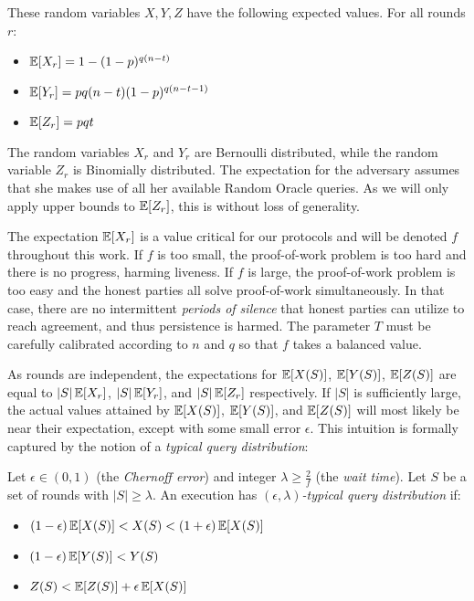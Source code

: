 These random variables $X, Y, Z$ have the following expected values. For all
rounds $r$:

\begin{itemize}
  \item $\operatorname{\mathbb{E}}[X_r] = 1 - (1 - p)^{q(n - t)}$
  \item $\operatorname{\mathbb{E}}[Y_r] = pq(n - t)(1 - p)^{q(n - t - 1)}$
  \item $\operatorname{\mathbb{E}}[Z_r] = pqt$
\end{itemize}

The random variables $X_r$ and $Y_r$ are Bernoulli distributed, while the
random variable $Z_r$ is Binomially distributed.
The expectation for the adversary assumes that she makes use of all
her available Random Oracle queries. As we will only apply upper bounds to
$\operatorname{\mathbb{E}}[Z_r]$, this is without loss of generality.

The expectation $\operatorname{\mathbb{E}}[X_r]$ is a value critical for our protocols and will be
denoted $f$ throughout this work. If $f$ is too small, the
proof-of-work problem is too hard and there is no progress, harming liveness.
If $f$ is large, the proof-of-work problem is too easy and the honest parties
all solve proof-of-work simultaneously. In that case, there are no intermittent
\emph{periods of silence} that honest parties can
utilize to reach agreement, and thus persistence is harmed. The parameter $T$
must be carefully calibrated according to $n$ and $q$ so that $f$ takes a
balanced value.

As rounds are independent, the expectations for $\operatorname{\mathbb{E}}[X(S)]$, $\operatorname{\mathbb{E}}[Y(S)]$,
$\operatorname{\mathbb{E}}[Z(S)]$ are equal to $|S|\operatorname{\mathbb{E}}[X_r]$, $|S|\operatorname{\mathbb{E}}[Y_r]$, and $|S|\operatorname{\mathbb{E}}[Z_r]$
respectively. If $|S|$ is sufficiently large, the actual values attained by
$\operatorname{\mathbb{E}}[X(S)]$, $\operatorname{\mathbb{E}}[Y(S)]$, and $\operatorname{\mathbb{E}}[Z(S)]$ will most likely be near their
expectation, except with some small error $\epsilon$. This intuition is formally
captured by the notion of a \emph{typical query distribution}:

\begin{definition}
  \index{$\epsilon$}\index{$\lambda$}
  Let $\epsilon \in (0, 1)$ (the \emph{Chernoff error}) and integer $\lambda
  \geq \frac{2}{f}$ (the \emph{wait time}). Let $S$ be a set of rounds with $|S|
  \geq \lambda$. An execution has \emph{$(\epsilon, \lambda)$-typical query
  distribution} if:

  \begin{itemize}
    \item $(1 - \epsilon)\operatorname{\mathbb{E}}[X(S)] < X(S) < (1 + \epsilon)\operatorname{\mathbb{E}}[X(S)]$
    \item $(1 - \epsilon)\operatorname{\mathbb{E}}[Y(S)] < Y(S)$
    \item $Z(S) < \operatorname{\mathbb{E}}[Z(S)] + \epsilon\operatorname{\mathbb{E}}[X(S)]$
  \end{itemize}
\end{definition}

